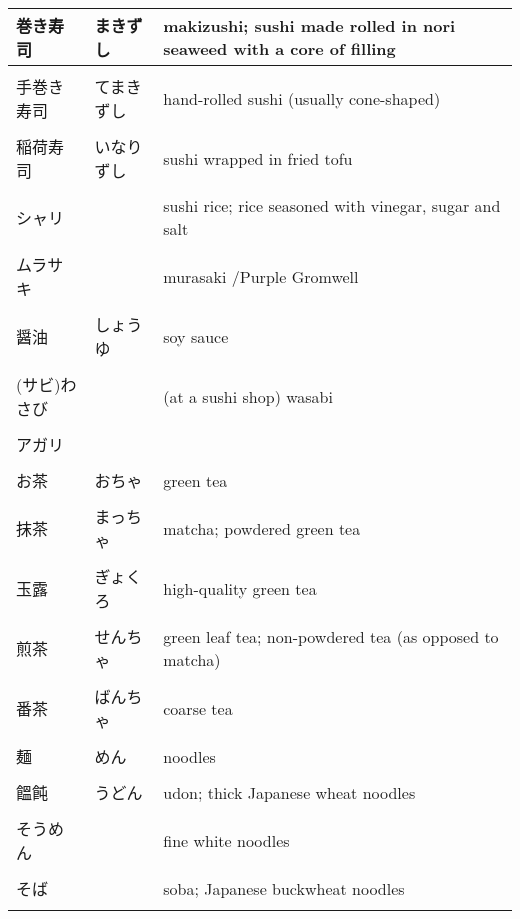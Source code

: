 \documentclass{article}
\begin{document}
\begin{tabular}{ l | l | p{11.5cm} }
巻き寿司 	&まきずし     	&makizushi; sushi made rolled in nori seaweed with a core of filling \\ \hline \\[-1em]
手巻き寿司	&てまきずし   	&hand-rolled sushi (usually cone-shaped) \\ \hline \\[-1em]
稲荷寿司 	&いなりずし  	&sushi wrapped in fried tofu \\ \hline \\[-1em]	
シャリ    	&         	&sushi rice; rice seasoned with vinegar, sugar and salt \\ \hline \\[-1em]
ムラサキ  	&      		&murasaki /Purple Gromwell \\ \hline \\[-1em]
醤油   	&しょうゆ     	&soy sauce \\ \hline \\[-1em]
(サビ)わさび	&     	&(at a sushi shop) wasabi \\ \hline \\[-1em]
アガリ   	&       	& \\ \hline \\[-1em]
お茶  	&おちゃ  	 	&green tea \\ \hline \\[-1em]													%
抹茶   	&まっちゃ   	&matcha; powdered green tea   \\ \hline \\[-1em]								%
玉露   	&ぎょくろ   	&high-quality green tea  \\ \hline \\[-1em]										%
煎茶   	&せんちゃ   	&green leaf tea; non-powdered tea (as opposed to matcha) \\ \hline \\[-1em]		%
番茶 	&ばんちゃ   	&coarse tea \\ \hline \\[-1em]													%
麺    	&めん     	&noodles \\ \hline \\[-1em]														%
饂飩    	&うどん     	&udon; thick Japanese wheat noodles \\ \hline \\[-1em] 							%
そうめん  	&         	&fine white noodles \\ \hline \\[-1em]							
そば     	&         	&soba; Japanese buckwheat noodles \\ \hline \\[-1em]

\end{tabular}
\end{document}
